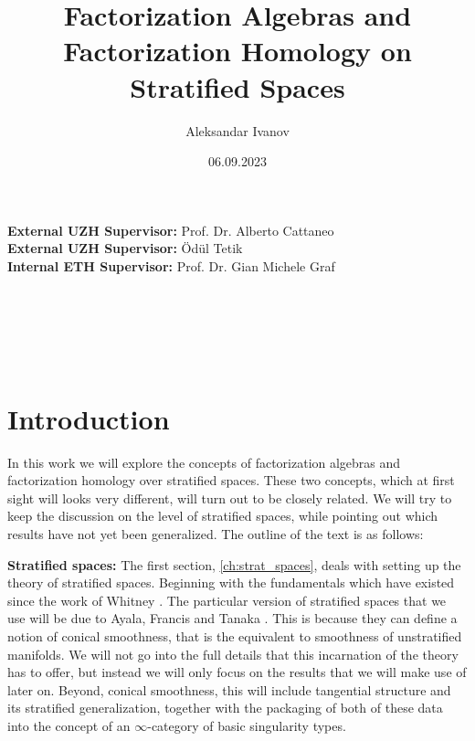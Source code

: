 \documentclass[12pt,a4paper]{article}
\theoremstyle{definition}
\theoremstyle{plain}
\theoremstyle{remark}
\begin{document}
\title{\texorpdfstring{\vspace*{5cm}}{}\sc Factorization Algebras and Factorization Homology on Stratified Spaces}
\author{Aleksandar Ivanov}
\date{06.09.2023}
\maketitle

\vspace{\fill}
\noindent
{\large \textbf{External UZH Supervisor:} Prof. Dr. Alberto Cattaneo}\\
{\large \textbf{External UZH Supervisor:} \"Od\"ul Tetik}\\
{\large \textbf{Internal ETH Supervisor:} Prof. Dr. Gian Michele Graf}\\ \\ \\ \\ \\ \\





\tableofcontents







\section{Introduction}

In this work we will explore the concepts of factorization algebras and factorization homology over stratified spaces. These two concepts, which at first sight will looks very different, will turn out to be closely related. We will try to keep the discussion on the level of stratified spaces, while pointing out which results have not yet been generalized. The outline of the text is as follows:

\textbf{Stratified spaces:} The first section, \cref{ch:strat_spaces}, deals with setting up the theory of stratified spaces. Beginning with the fundamentals which have existed since the work of Whitney \cite{whitney92}. The particular version of stratified spaces that we use will be due to Ayala, Francis and Tanaka \cite{aft_localstrut}. This is because they can define a notion of conical smoothness, that is the equivalent to smoothness of unstratified manifolds. We will not go into the full details that this incarnation of the theory has to offer, but instead we will only focus on the results that we will make use of later on. Beyond, conical smoothness, this will include tangential structure and its stratified generalization, together with the packaging of both of these data into the concept of an $\infty$-category of basic singularity types.
\end{document}
